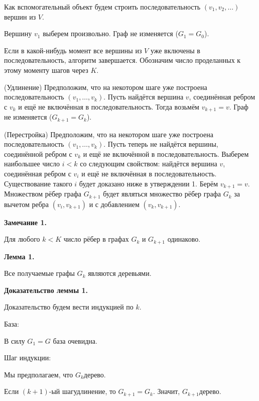 \documentclass[a4paper,12pt]{article}
\begin{document}
Как вспомогательный объект будем строить последовательность $(v_1, v_2, \ldots)$ вершин из $V$.
\begin{nums}{-3}
\item
Вершину $v_1$ выберем произвольно. Граф не изменяется ($G_1 = G_0$).
\item
Если в какой-нибудь момент все вершины из $V$ уже включены в последовательность, алгоритм завершается. Обозначим число проделанных к этому моменту шагов через $K$.
\item
 (Удлинение)
Предположим, что на некотором шаге уже построена последовательность $(v_1, \ldots, v_k)$. Пусть найдётся вершина $v$, соединённая ребром с $v_k$ и ещё не включённая в последовательность. Тогда возьмём $v_{k+1} = v$. Граф не изменяется ($G_{k+1} = G_k$).
\item
 (Перестройка)
Предположим, что на некотором шаге уже построена последовательность $(v_1, \ldots, v_k)$. Пусть теперь не найдётся вершины, соединённой ребром с $v_k$ и ещё не включённой в последовательность. Выберем наибольшее число $i < k$ со следующим свойством: найдётся вершина $v$, соединённая ребром с $v_i$ и ещё не включённая в последовательность. Существование такого $i$ будет доказано ниже в утверждении 1. Берём $v_{k+1} = v$. Множеством рёбер графа $G_{k+1}$ будет являться множество рёбер графа $G_k$ за вычетом ребра $(v_i, v_{k+1})$ и с добавлением $(v_k, v_{k+1})$.
\end{nums}

{\bf Замечание 1.}

Для любого $k < K$ число рёбер в графах $G_k$ и $G_{k+1}$ одинаково.

{\bf Лемма 1.}

Все получаемые графы $G_k$ являются деревьями.

{\bf Доказательство леммы 1.}

Доказательство будем вести индукцией по $k$.

База:

В силу $G_1 = G$ база очевидна.

Шаг индукции:

Мы предполагаем, что $G_k$\т дерево.

Если $(k+1)$-ый шаг\т удлинение, то $G_{k+1} = G_k$. Значит, $G_{k+1}$\т дерево.
\end{document}
